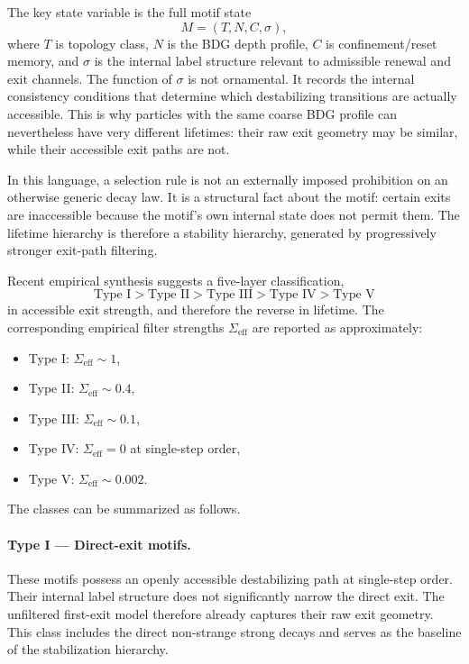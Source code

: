 \documentclass[11pt]{article}
\begin{document}
The key state variable is the full motif state
\[
M=(T,N,C,\sigma),
\]
where $T$ is topology class, $N$ is the BDG depth profile, $C$ is confinement/reset memory, and $\sigma$ is the internal label structure relevant to admissible renewal and exit channels. The function of $\sigma$ is not ornamental. It records the internal consistency conditions that determine which destabilizing transitions are actually accessible. This is why particles with the same coarse BDG profile can nevertheless have very different lifetimes: their raw exit geometry may be similar, while their accessible exit paths are not.

In this language, a selection rule is not an externally imposed prohibition on an otherwise generic decay law. It is a structural fact about the motif: certain exits are inaccessible because the motif's own internal state does not permit them. The lifetime hierarchy is therefore a stability hierarchy, generated by progressively stronger exit-path filtering.

Recent empirical synthesis suggests a five-layer classification,
\[
\text{Type I} > \text{Type II} > \text{Type III} > \text{Type IV} > \text{Type V}
\]
in accessible exit strength, and therefore the reverse in lifetime. The corresponding empirical filter strengths $\Sigma_{\mathrm{eff}}$ are reported as approximately:
\begin{itemize}
    \item Type I: $\Sigma_{\mathrm{eff}}\sim 1$,
    \item Type II: $\Sigma_{\mathrm{eff}}\sim 0.4$,
    \item Type III: $\Sigma_{\mathrm{eff}}\sim 0.1$,
    \item Type IV: $\Sigma_{\mathrm{eff}}=0$ at single-step order,
    \item Type V: $\Sigma_{\mathrm{eff}}\sim 0.002$.
\end{itemize}

The classes can be summarized as follows.

\paragraph{Type I --- Direct-exit motifs.}
These motifs possess an openly accessible destabilizing path at single-step order. Their internal label structure does not significantly narrow the direct exit. The unfiltered first-exit model therefore already captures their raw exit geometry. This class includes the direct non-strange strong decays and serves as the baseline of the stabilization hierarchy.
\end{document}
